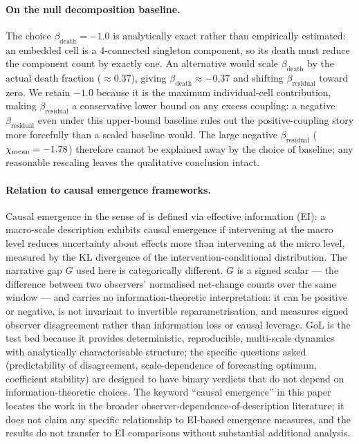 \documentclass[aip,cha,preprint,nofootinbib]{revtex4-2}
\newcommand{\bdeath}{\beta_{\mathrm{death}}}
\newcommand{\bres}{\beta_{\mathrm{residual}}}
\begin{document}
\paragraph{On the null decomposition baseline.}
The choice $\bdeath=-1.0$ is analytically exact rather than empirically
estimated: an embedded cell is a 4-connected singleton component, so its
death must reduce the component count by exactly one.
An alternative would scale $\bdeath$ by the actual death fraction
($\approx0.37$), giving $\bdeath\approx-0.37$ and shifting $\bres$ toward
zero.
We retain $-1.0$ because it is the maximum individual-cell contribution,
making $\bres$ a conservative lower bound on any excess coupling: a negative
$\bres$ even under this upper-bound baseline rules out the positive-coupling
story more forcefully than a scaled baseline would.
The large negative $\bres$ ($\chi_{\rm mean}=-1.78$) therefore cannot be
explained away by the choice of baseline; any reasonable rescaling leaves the
qualitative conclusion intact.

\paragraph{Relation to causal emergence frameworks.}
Causal emergence in the sense of \citet{hoel2013} is defined via effective
information (EI): a macro-scale description exhibits causal emergence if
intervening at the macro level reduces uncertainty about effects more than
intervening at the micro level, measured by the KL divergence of the
intervention-conditional distribution.
The narrative gap $G$ used here is categorically different.
$G$ is a signed scalar — the difference between two observers' normalised
net-change counts over the same window — and carries no information-theoretic
interpretation: it can be positive or negative, is not invariant to invertible
reparametrisation, and measures signed observer disagreement rather than
information loss or causal leverage.
GoL is the test bed because it provides deterministic, reproducible,
multi-scale dynamics with analytically characterisable structure; the
specific questions asked (predictability of disagreement, scale-dependence
of forecasting optimum, coefficient stability) are designed to have
binary verdicts that do not depend on information-theoretic choices.
The keyword ``causal emergence'' in this paper locates the work in the
broader observer-dependence-of-description literature; it does not claim
any specific relationship to EI-based emergence measures, and the results
do not transfer to EI comparisons without substantial additional analysis.
\end{document}
